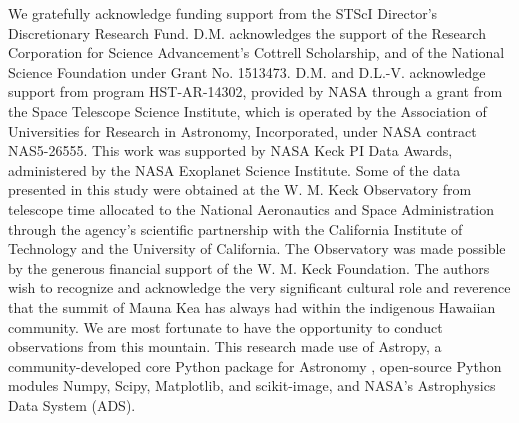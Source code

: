\documentclass[preprint2]{aastex6}
\begin{document}


% 





%
%

\acknowledgements

\noindent We gratefully acknowledge funding support from the STScI Director's Discretionary Research Fund. D.M. acknowledges the support of the Research Corporation for Science Advancement's Cottrell Scholarship, and of the National Science Foundation under Grant No. 1513473. D.M. and D.L.-V. acknowledge support from program HST-AR-14302, provided by NASA through a grant from the Space Telescope Science Institute, which is operated by the Association of Universities for Research in Astronomy, Incorporated, under NASA contract NAS5-26555. This work was supported by NASA Keck PI Data Awards, administered by the NASA Exoplanet Science Institute. Some of the data presented in this study were obtained at the W. M. Keck Observatory from telescope time allocated to the National Aeronautics and Space Administration through the agency's scientific partnership with the California Institute of Technology and the University of California. The Observatory was made possible by the generous financial support of the W. M. Keck Foundation. The authors wish to recognize and acknowledge the very significant cultural role and reverence that the summit of Mauna Kea has always had within the indigenous Hawaiian community. We are most fortunate to have the opportunity to conduct observations from this mountain. This research made use of Astropy, a community-developed core Python package for Astronomy \citep{astropy}, open-source Python modules Numpy, Scipy, Matplotlib, and scikit-image, and NASA's Astrophysics Data System (ADS).  \\
\end{document}
